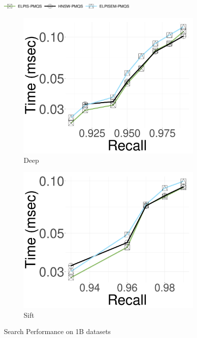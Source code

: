 	\begin{figure}
		\captionsetup{justification=centering}
  \centering
  \includegraphics[width=0.6\textwidth]{../img/elpis2/EM/legendem.png}
  
		\captionsetup[subfigure]{justification=centering}
  	\centering
		\begin{subfigure}{0.3\textwidth}
			\includegraphics[width=\textwidth]{../img/elpis2/EM/1B/deep_Time.png}
			\caption{Deep}  
		\label{fig:elpisem:query:performance:1B:deep:10NN}
		\end{subfigure}
  \hspace{0.4cm}
		\begin{subfigure}{0.3\textwidth}
			\includegraphics[width=\textwidth]{../img/elpis2/EM/1B/sift_Time.png}
			\caption{Sift}  
			\label{fig:elpisem:query:performance:1B:sift:10NN}
		\end{subfigure}
		\caption{{Search Performance on 1B datasets}}	
		\label{fig:elpisem:query:performance:1B}
	\end{figure}

